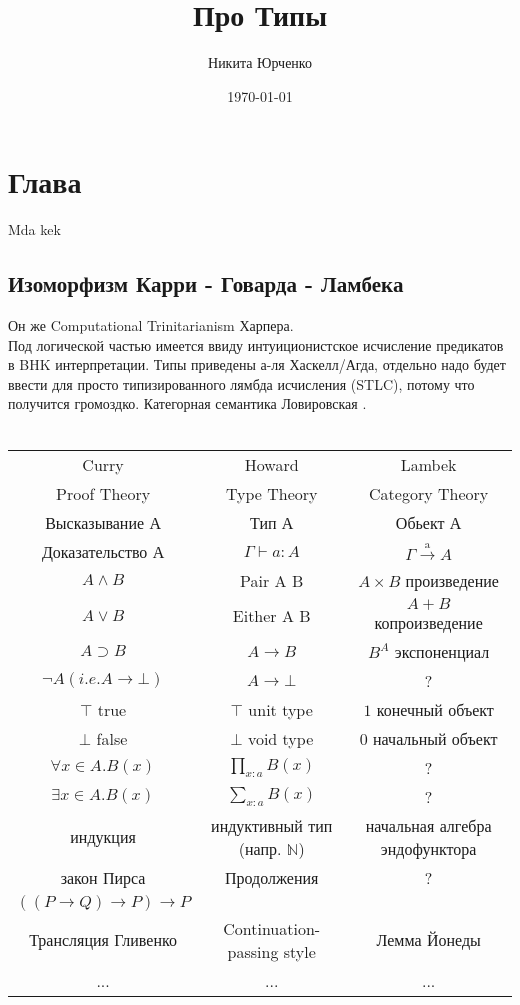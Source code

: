 \documentclass[10pt,a4paper]{article}
\date{\today}
\author{Никита Юрченко}
\title{Про Типы}
\theoremstyle{definition}
\begin{document}
\maketitle
\newpage
{}  

\section{Глава}
Mda kek \\
\subsection{Изоморфизм Карри - Говарда - Ламбека}

Он же Computational Trinitarianism Харпера.\\
Под логической частью имеется ввиду интуиционистское исчисление предикатов в BHK интерпретации. Типы приведены а-ля Хаскелл/Агда, отдельно надо будет ввести для просто типизированного лямбда исчисления (STLC), потому что получится громоздко. Категорная семантика Ловировская \cite{adjointnessLawvere}.\\ \\
\begin{tabular}{ | c | c | c | }
  \hline
  Curry & Howard & Lambek \\
  Proof Theory & Type Theory & Category Theory \\ \hline
  Высказывание А & Тип А & Обьект А \\
  Доказательство А & $\Gamma \vdash a : A$ & $ \Gamma \xrightarrow{\text{a}} A$ \\
  $ A \wedge B $ & Pair A B & $A \times B $ произведение \\
  $ A \vee B$ & Either A B & $A + B $ копроизведение \\
  $ A \supset B $ & $ A \rightarrow B $ & $B^A $ экспоненциал \\
  $\neg A (i. e. A \rightarrow \bot)$ & $ A \rightarrow \bot$ & ?  \\
  $\top$ true & $ \top $ unit type  & $1$ конечный объект \\
  $\bot$ false & $ \bot$ void type  & $0$ начальный объект \\
  \hline
  $\forall x \in A . B(x)$ & $\prod_{x:a}^{} B(x)$ & ? \\
  $\exists x \in A . B(x)$ & $\sum_{x:a}^{} B(x)$ & ? \\
  \hline
  индукция & индуктивный тип (напр. $\mathbb{N}$) & начальная алгебра эндофунктора \\
  \hline
  закон Пирса  & Продолжения  & ? \\
  $ ((P \rightarrow Q) \rightarrow P) \rightarrow P$ & & \\
  \hline
  Трансляция Гливенко & Continuation-passing style & Лемма Йонеды \\
  \hline
  ... & ... & ... \\
  \hline
\end{tabular}
\end{document}
